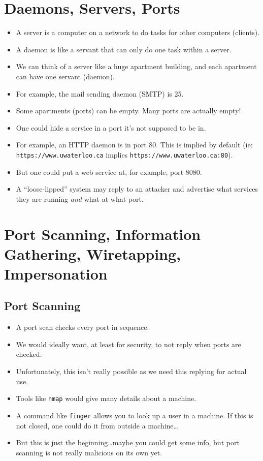 \documentclass{article}
\begin{document}
\section{Daemons, Servers, Ports}
\begin{itemize}
    \item A server is a computer on a network to do tasks for other computers (clients).
    \item A daemon is like a servant that can only do one task within a server.
    \item We can think of a server like a huge apartment building, and each apartment can have one servant (daemon).
    \item For example, the mail sending daemon (SMTP) is 25.
    \item Some apartments (ports) can be empty.  Many ports are actually empty!
    \item One could hide a service in a port it's not supposed to be in.
    \item For example, an HTTP daemon is in port 80.  This is implied by default (ie: \lstinline{https://www.uwaterloo.ca} implies \lstinline{https://www.uwaterloo.ca:80}).
    \item But one could put a web service at, for example, port 8080.
    \item A ``loose-lipped'' system may reply to an attacker and advertise what services they are running \emph{and} what at what port.
\end{itemize}

\section{Port Scanning, Information Gathering, Wiretapping, Impersonation}

\subsection{Port Scanning}
\begin{itemize}
    \item A port scan checks every port in sequence.
    \item We would ideally want, at least for security, to not reply when ports are checked.
    \item Unfortunately, this isn't really possible as we need this replying for actual use.
    \item Tools like \lstinline{nmap} would give many details about a machine.
    \item A command like \lstinline{finger} allows you to look up a user in a machine.  If this is not closed, one could do it from outside a machine\dots
    \item But this is just the beginning\dots maybe you could get some info, but port scanning is not really malicious on its own yet.
\end{itemize}
\end{document}
